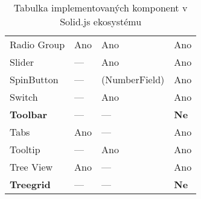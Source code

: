 \begin{table}[ht]
\begin{tabularx}{\textwidth}{Y Y Y Y}
        Radio Group           & Ano                   & Ano                & Ano                               \\
        Slider                & ---                   & Ano                & Ano                               \\
        SpinButton            & ---                   & (NumberField)      & Ano                               \\
        Switch                & ---                   & Ano                & Ano                               \\
        \textbf{Toolbar}      & ---                   & ---                & \textbf{Ne}                       \\
        Tabs                  & Ano                   & ---                & Ano                               \\
        Tooltip               & ---                   & Ano                & Ano                               \\
        Tree View             & Ano                   & ---                & Ano                               \\
        \textbf{Treegrid}     & ---                   & ---                & \textbf{Ne}
    \end{tabularx}
    \caption{Tabulka implementovaných komponent v Solid.js ekosystému}
    \label{tab:implemented-components}
\end{table}
